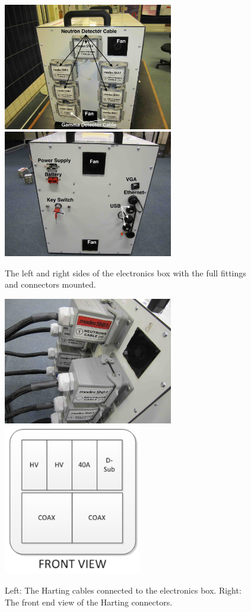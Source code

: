 \begin{figure}[htbp]
\begin{center}
\includegraphics[width=74mm]{Chapter6/figures/electronicsBoxSide1.jpg} 
\includegraphics[width=74mm]{Chapter6/figures/electronicsBoxSide2.jpg} 
\caption{The left and right sides of the electronics box with the full fittings and connectors mounted.}
\label{fig:electronicsBoxSides}
\end{center}
\end{figure}

\begin{figure}[htbp]
\begin{center}
\includegraphics[width=74mm]{Chapter6/figures/hartingCables1.jpg} 
\includegraphics[width=60mm]{Chapter6/figures/hartingCables3.png} 
\caption{Left: The Harting cables connected to the electronics box. Right: The front end view of the Harting connectors.}
\label{fig:hartingCables}
\end{center}
\end{figure}

